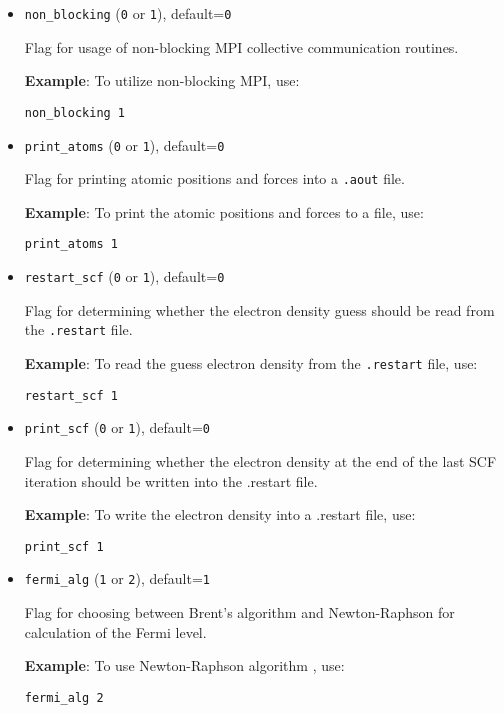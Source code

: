 \documentclass[12pt]{report}
\begin{document}
\begin{itemize}
\item\texttt{non\_blocking} (\texttt{0} or \texttt{1}), default=\texttt{0}

Flag for usage of non-blocking MPI collective communication routines. 

{\bf{Example}}: To utilize non-blocking MPI, use: 

\texttt{non\_blocking 1}

\item\texttt{print\_atoms} (\texttt{0} or \texttt{1}), default=\texttt{0}

Flag for printing atomic positions and forces into a \texttt{.aout} file. 

{\bf{Example}}: To print the atomic positions and forces to a file, use: 

\texttt{print\_atoms 1}

\item\texttt{restart\_scf} (\texttt{0} or \texttt{1}), default=\texttt{0}

Flag for determining whether the electron density guess should be read from the \texttt{.restart} file.
 
{\bf{Example}}: To read the guess electron density from the \texttt{.restart} file, use: 

\texttt{restart\_scf 1}

\item\texttt{print\_scf} (\texttt{0} or \texttt{1}), default=\texttt{0}

Flag for determining whether the electron density at the end of the last SCF iteration should be written into the .restart file. 

{\bf{Example}}: To write the electron density into a .restart file, use: 

\texttt{print\_scf 1}

\item\texttt{fermi\_alg} (\texttt{1} or \texttt{2}), default=\texttt{1}

Flag for choosing between Brent's algorithm and Newton-Raphson for calculation of the Fermi level. 

{\bf{Example}}: To use Newton-Raphson algorithm , use: 

\texttt{fermi\_alg 2}

\end{itemize}

\end{document}
